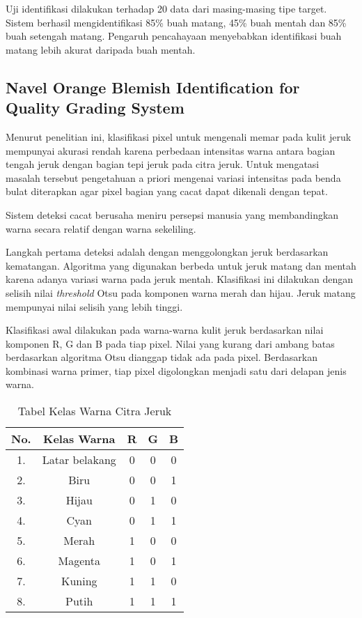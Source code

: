 \documentclass[laporan.tex]{subfiles}
\begin{document}
Uji identifikasi dilakukan terhadap 20 data dari masing-masing tipe target. Sistem berhasil mengidentifikasi 85\% buah matang, 45\% buah mentah dan 85\% buah setengah matang. Pengaruh pencahayaan menyebabkan identifikasi buah matang lebih akurat daripada buah mentah.

\subsection{Navel Orange Blemish Identification for Quality Grading System}

Menurut penelitian ini, klasifikasi pixel untuk mengenali memar pada kulit jeruk mempunyai akurasi rendah karena perbedaan intensitas warna antara bagian tengah jeruk dengan bagian tepi jeruk pada citra jeruk. Untuk mengatasi masalah tersebut pengetahuan a priori mengenai variasi intensitas pada benda bulat diterapkan agar pixel bagian yang cacat dapat dikenali dengan tepat.\cite{liu}

Sistem deteksi cacat berusaha meniru persepsi manusia yang membandingkan warna secara relatif dengan warna sekeliling.

Langkah pertama deteksi adalah dengan menggolongkan jeruk berdasarkan kematangan. Algoritma yang digunakan berbeda untuk jeruk matang dan mentah karena adanya variasi warna pada jeruk mentah. Klasifikasi ini dilakukan dengan selisih nilai \emph{threshold} Otsu pada komponen warna merah dan hijau. Jeruk matang mempunyai nilai selisih yang lebih tinggi.

Klasifikasi awal dilakukan pada warna-warna kulit jeruk berdasarkan nilai komponen R, G dan B pada tiap pixel. Nilai yang kurang dari ambang batas berdasarkan algoritma Otsu dianggap tidak ada pada pixel. Berdasarkan kombinasi warna primer, tiap pixel digolongkan menjadi satu dari delapan jenis warna.

\begin{table}[h]
\centering
\begin{tabular}{|c|c|c|c|c|}
\hline
No. & Kelas Warna & R & G & B \\
\hline
1. & Latar belakang & 0 & 0 & 0 \\
2. & Biru & 0 & 0 & 1 \\
3. & Hijau & 0 & 1 & 0 \\
4. & Cyan & 0 & 1 & 1 \\
5. & Merah & 1 & 0 & 0 \\
6. & Magenta & 1 & 0 & 1 \\
7. & Kuning & 1 & 1 & 0 \\
8. & Putih & 1 & 1 & 1 \\
\hline
\end{tabular}
\caption{Tabel Kelas Warna Citra Jeruk}
\label{table:colorclass}
\end{table}
\end{document}
